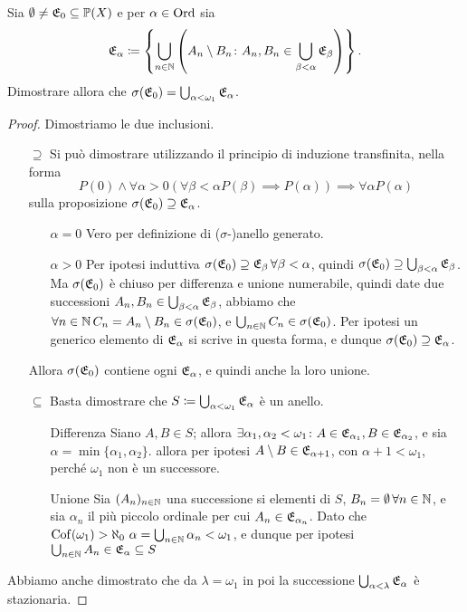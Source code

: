 \documentclass[../EserciziIstituzioniAnalisi.tex]{subfiles}
\begin{document}
\begin{exercise}  
  Sia $\emptyset \neq \mathfrak E_0 \subseteq \mathbb P(X)$ e per $\alpha \in \operatorname{Ord}$ sia 
\begin{equation}
  \mathfrak E_{\alpha}\coloneqq \left\{ \bigcup_{n\in \mathbb N} \left(A_n\setminus B_n \colon A_n,B_n \in \bigcup_{\beta<\alpha}\mathfrak E_{\beta}\right)\right\}.
\end{equation}
Dimostrare allora che $\sigma(\mathfrak E_0)=\bigcup_{\alpha<\omega_1}\mathfrak E_{\alpha}$.
\end{exercise}
\begin{proof}
  Dimostriamo le due inclusioni.
  \begin{itemize}
    \item[$\supseteq$] Si può dimostrare utilizzando il principio di induzione transfinita, nella forma
    $$P(0)\land \forall \alpha>0 \left(\forall \beta<\alpha P(\beta) \implies P(\alpha) \right) \implies \forall \alpha P(\alpha)$$
    sulla proposizione $\sigma(\mathfrak E_0)\supseteq\mathfrak E_{\alpha}$.
    \begin{itemize}
      \item[$\alpha=0$] Vero per definizione di ($\sigma$-)anello generato.
      \item[$\alpha>0$] Per ipotesi induttiva $\sigma(\mathfrak E_0)\supseteq\mathfrak E_{\beta}\, \forall \beta<\alpha$, quindi $\sigma(\mathfrak E_0)\supseteq\bigcup_{\beta<\alpha}\mathfrak E_{\beta}$. Ma $\sigma(\mathfrak E_0)$ è chiuso per differenza e unione numerabile, quindi date due successioni $A_n, B_n \in \bigcup_{\beta<\alpha}\mathfrak E_{\beta}$, abbiamo che $\forall n \in \mathbb N\, C_n=A_n\setminus B_n\in \sigma(\mathfrak E_0)$, e $\bigcup_{n\in \mathbb N}C_n \in \sigma(\mathfrak E_0)$. Per ipotesi un generico elemento di $\mathfrak E_{\alpha}$ si scrive in questa forma, e dunque $\sigma(\mathfrak E_0)\supseteq\mathfrak E_{\alpha}$.
    \end{itemize}
    Allora $\sigma(\mathfrak E_0)$ contiene ogni $\mathfrak E_{\alpha}$, e quindi anche la loro unione.
    \item[$\subseteq$] Basta dimostrare che $S\coloneqq\bigcup_{\alpha<\omega_1}\mathfrak E_{\alpha}$ è un anello.
    \begin{itemize}
      \item[Differenza] Siano $A,B\in S$; allora $\exists \alpha_1, \alpha_2<\omega_1 \colon A\in \mathfrak E_{\alpha_1}, B\in \mathfrak E_{\alpha_2}$, e sia $\alpha=\min\{\alpha_1, \alpha_2\}$. allora per ipotesi $A\setminus B\in\mathfrak E_{\alpha+1}$, con $\alpha+1<\omega_1$, perché $\omega_1$ non è un successore.      
      \item[Unione] Sia $(A_n)_{n\in\mathbb N}$ una successione si elementi di $S$, $B_n=\emptyset \, \forall n \in \mathbb N$, e sia $\alpha_n$ il più piccolo ordinale per cui $A_n\in \mathfrak E_{\alpha_n}$. Dato che $\operatorname{Cof}(\omega_1)>\aleph_0\ \alpha=\bigcup_{n \in \mathbb N}\alpha_n<\omega_1$, e dunque per ipotesi $\bigcup_{n \in \mathbb N} A_n\in \mathfrak E_{\alpha}\subseteq S$
    \end{itemize}
  \end{itemize}
  Abbiamo anche dimostrato che da $\lambda=\omega_1$ in poi la successione $\bigcup_{\alpha<\lambda}\mathfrak E_{\alpha}$ è stazionaria.
\end{proof}
\end{document}
